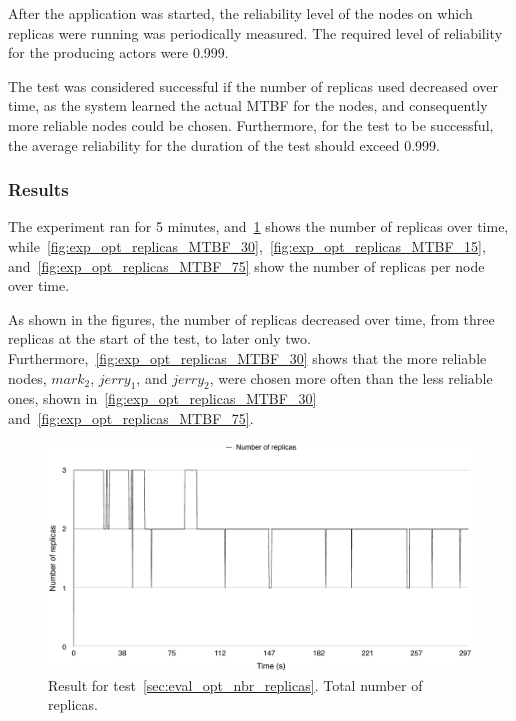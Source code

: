 \documentclass{cslthse-msc}
\begin{document}
After the application was started, the reliability level of the nodes on which replicas were running was periodically measured. The required level of reliability for the producing actors were 0.999.

The test was considered successful if the number of replicas used decreased over time, as the system learned the actual MTBF for the nodes, and consequently more reliable nodes could be chosen. Furthermore, for the test to be successful, the average reliability for the duration of the test should exceed 0.999. %

\subsubsection*{Results}
The experiment ran for 5 minutes, and~\cref{fig:exp_opt_replicas_total} shows the number of replicas over time, while~\cref{fig:exp_opt_replicas_MTBF_30},~\cref{fig:exp_opt_replicas_MTBF_15}, and~\cref{fig:exp_opt_replicas_MTBF_75} show the number of replicas per node over time.

As shown in the figures, the number of replicas decreased over time, from three replicas at the start of the test, to later only two. Furthermore,~\cref{fig:exp_opt_replicas_MTBF_30} shows that the more reliable nodes, $mark_2$, $jerry_1$, and $jerry_2$, were chosen more often than the less reliable ones, shown in~\cref{fig:exp_opt_replicas_MTBF_30} and~\cref{fig:exp_opt_replicas_MTBF_75}.

\begin{figure}[!hbt]
\centering
\includegraphics[scale=0.5]{images/results/optimal_replicas/total.pdf}
\caption{Result for test~\ref{sec:eval_opt_nbr_replicas}. Total number of replicas.} \label{fig:exp_opt_replicas_total}
\end{figure}
\end{document}
